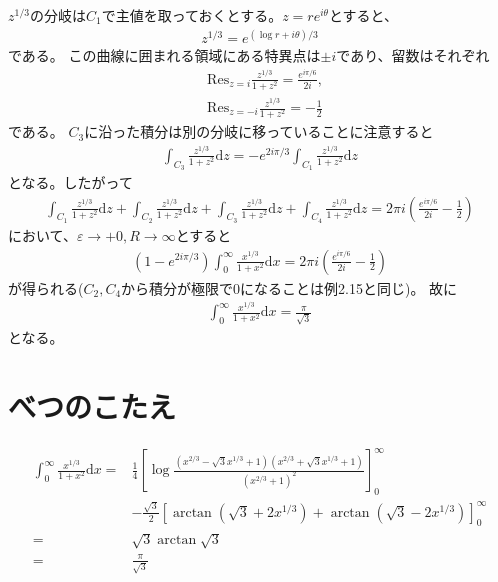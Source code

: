 \documentclass{jsarticle}
\def\diff{\textrm{d}}
\begin{document}
$z^{1/3}$の分岐は$C_{1}$で主値を取っておくとする。$z=re^{i\theta}$とすると、
\begin{align*}
    z^{1/3}=e^{(\log r+i\theta)/3}
\end{align*}
である。
この曲線に囲まれる領域にある特異点は$\pm i$であり、留数はそれぞれ
\begin{align*}
    &\mathrm{Res}_{z=i}\frac{z^{1/3}}{1+z^{2}}=\frac{e^{i\pi/6}}{2i},\\
    &\mathrm{Res}_{z=-i}\frac{z^{1/3}}{1+z^{2}}=-\frac{1}{2}
\end{align*}
である。
$C_{3}$に沿った積分は別の分岐に移っていることに注意すると
\begin{align*}
    \int_{C_{3}}\frac{z^{1/3}}{1+z^{2}}\diff z=-e^{2i\pi/3}\int_{C_{1}}\frac{z^{1/3}}{1+z^{2}}\diff z
\end{align*}
となる。したがって
\begin{align*}
    \int_{C_{1}}\frac{z^{1/3}}{1+z^{2}}\diff z
    +\int_{C_{2}}\frac{z^{1/3}}{1+z^{2}}\diff z
    +\int_{C_{3}}\frac{z^{1/3}}{1+z^{2}}\diff z
    +\int_{C_{4}}\frac{z^{1/3}}{1+z^{2}}\diff z
    =2\pi i\left(\frac{e^{i\pi/6}}{2i}-\frac{1}{2}\right)
\end{align*}
において、$\varepsilon\to+0,R\to\infty$とすると
\begin{align*}
    (1-e^{2i\pi/3})\int_{0}^{\infty}\frac{x^{1/3}}{1+x^{2}}\diff x
    =2\pi i\left(\frac{e^{i\pi/6}}{2i}-\frac{1}{2}\right)
\end{align*}
が得られる($C_{2},C_{4}$から積分が極限で$0$になることは例2.15と同じ)。
故に
\begin{align*}
    \int_{0}^{\infty}\frac{x^{1/3}}{1+x^{2}}\diff x=\frac{\pi}{\sqrt{3}}
\end{align*}
となる。

\section*{べつのこたえ}
\begin{align*}
    \int_{0}^{\infty}\frac{x^{1/3}}{1+x^{2}}\diff x
    =&\frac{1}{4}\left[\log\frac{(x^{2/3}-\sqrt{3}x^{1/3}+1)(x^{2/3}+\sqrt{3}x^{1/3}+1)}{(x^{2/3}+1)^{2}}\right]_{0}^{\infty}\\
    &-\frac{\sqrt{3}}{2}\left[\arctan(\sqrt{3}+2x^{1/3})+\arctan(\sqrt{3}-2x^{1/3})\right]_{0}^{\infty}\\
    =&\sqrt{3}\arctan\sqrt{3}\\
    =&\frac{\pi}{\sqrt{3}}
\end{align*}
\end{document}
